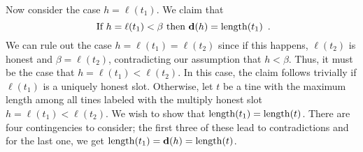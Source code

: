     Now consider the case $h = \ell(t_1)$. 
    We claim that 
    \begin{equation}\label{eq:hdepth-t1}
      \text{
        If $h = \ell(t_1) < \beta$ then $\mathbf{d}(h) = \operatorname{length}(t_1)$ 
        }
      \,.
    \end{equation}
    We can rule out the case $h = \ell(t_1) = \ell(t_2)$ 
    since if this happens, 
    $\ell(t_2)$ is honest and $\beta = \ell(t_2)$, 
    contradicting our assumption that $h < \beta$. 
    Thus, it must be the case that $h = \ell(t_1) < \ell(t_2)$.    
    In this case, the claim follows trivially 
    if $\ell(t_1)$ is a uniquely honest slot. 
    Otherwise, let $t$ be a tine 
    with the maximum length among all tines 
    labeled with the multiply honest slot $h = \ell(t_1) < \ell(t_2)$. 
    We wish to show that $\operatorname{length}(t_1) = \operatorname{length}(t)$. 
    There are four contingencies to consider; 
    the first three of these lead to contradictions 
    and for the last one, we get $\operatorname{length}(t_1) = \mathbf{d}(h) = \operatorname{length}(t)$.
